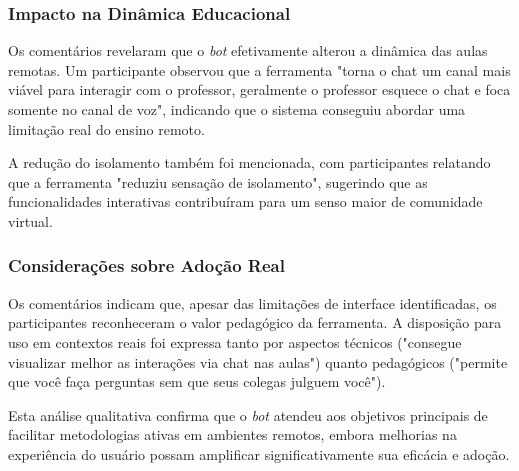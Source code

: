 \subsubsection{Impacto na Dinâmica Educacional}

Os comentários revelaram que o \textit{bot} efetivamente alterou a dinâmica das
aulas remotas. Um participante observou que a ferramenta "torna o chat um canal
mais viável para interagir com o professor, geralmente o professor esquece o
chat e foca somente no canal de voz", indicando que o sistema conseguiu abordar
uma limitação real do ensino remoto.

A redução do isolamento também foi mencionada, com participantes relatando que
a ferramenta "reduziu sensação de isolamento", sugerindo que as funcionalidades
interativas contribuíram para um senso maior de comunidade virtual.

\subsubsection{Considerações sobre Adoção Real}

Os comentários indicam que, apesar das limitações de interface identificadas, os
participantes reconheceram o valor pedagógico da ferramenta. A disposição para
uso em contextos reais foi expressa tanto por aspectos técnicos ("consegue
visualizar melhor as interações via chat nas aulas") quanto pedagógicos
("permite que você faça perguntas sem que seus colegas julguem você").

Esta análise qualitativa confirma que o \textit{bot} atendeu aos objetivos
principais de facilitar metodologias ativas em ambientes remotos, embora
melhorias na experiência do usuário possam amplificar significativamente sua
eficácia e adoção.
